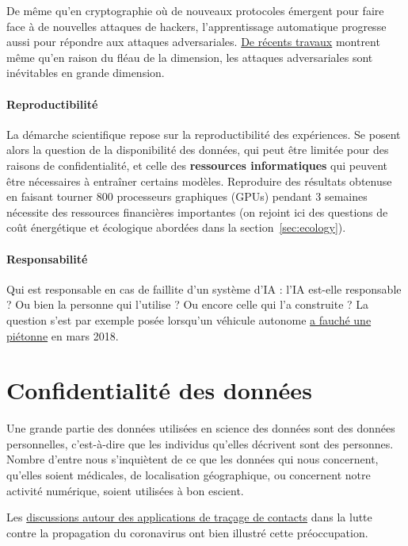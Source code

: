 De même qu'en cryptographie où de nouveaux protocoles émergent pour faire face
à de nouvelles attaques de hackers, l'apprentissage automatique progresse aussi
pour répondre aux attaques
adversariales. \href{http://proceedings.mlr.press/v97/simon-gabriel19a.html}{De
  récents travaux} montrent même qu'en raison du fléau de la dimension, les
attaques adversariales sont inévitables en grande dimension.

\paragraph{Reproductibilité} La démarche scientifique repose sur la
reproductibilité des expériences. Se posent alors la question de la
disponibilité des données, qui peut être limitée pour des raisons de
confidentialité, et celle des \textbf{ressources informatiques} qui peuvent
être nécessaires à entraîner certains modèles. Reproduire des résultats
obtenuse en faisant tourner 800 processeurs graphiques (GPUs) pendant 3
semaines nécessite des ressources financières importantes (on rejoint ici des
questions de coût énergétique et écologique abordées dans la
section~\ref{sec:ecology}).

\paragraph{Responsabilité} Qui est responsable en cas de faillite d'un
système d'IA : l'IA est-elle responsable ? Ou bien la personne qui l'utilise ?
Ou encore celle qui l'a construite ? La question s'est par exemple posée
lorsqu'un véhicule autonome
\href{https://www.nextinpact.com/news/108432-cause-probable-accident-mortel-uber-tout-monde-en-prend-pour-son-grade.htm}{a
  fauché une piétonne} en mars 2018.


\section{Confidentialité des données}
Une grande partie des données utilisées en science des données sont des données
personnelles, c'est-à-dire que les individus qu'elles décrivent sont des
personnes. Nombre d'entre nous s'inquiètent de ce que les données qui nous
concernent, qu'elles soient médicales, de localisation géographique, ou
concernent notre activité numérique, soient utilisées à bon escient.

Les \href{https://risques-tracage.fr/}{discussions autour des applications de traçage de
contacts}
dans la lutte contre la propagation du coronavirus ont bien illustré cette
préoccupation.


